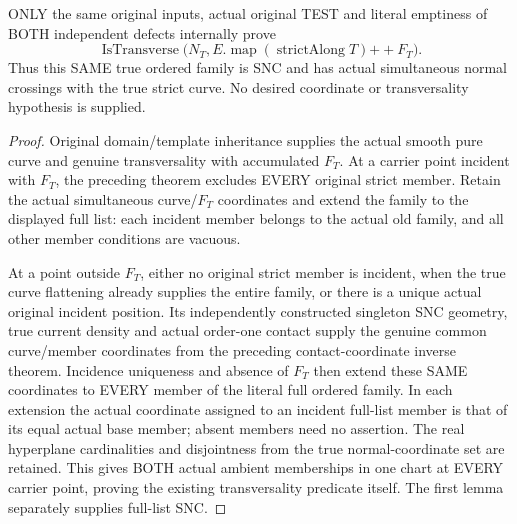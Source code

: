 \begin{theorem}
\label{hir:sharp-original-curve-two-empty-defects-whole-boundary-transverse}
\leanok
ONLY the same original inputs, actual original TEST and literal emptiness
of BOTH independent defects internally prove
\[
 \operatorname{IsTransverse}\bigl(N_T,
   E.\operatorname{map}(\operatorname{strictAlong}T)\mathbin{++}F_T\bigr).
\]
Thus this SAME true ordered family is SNC and has actual simultaneous
normal crossings with the true strict curve. No desired coordinate or
transversality hypothesis is supplied.
\end{theorem}
\begin{proof}
Original domain/template inheritance supplies the actual smooth pure
curve and genuine transversality with accumulated $F_T$.
At a carrier point incident with $F_T$, the preceding theorem excludes
EVERY original strict member. Retain the actual simultaneous curve/$F_T$
coordinates and extend the family to the displayed full list: each
incident member belongs to the actual old family, and all other member
conditions are vacuous.

At a point outside $F_T$, either no original strict member is incident,
when the true curve flattening already supplies the entire family, or
there is a unique actual original incident position. Its independently
constructed singleton SNC geometry, true current density and actual
order-one contact supply the genuine common curve/member coordinates
from the preceding contact-coordinate inverse theorem. Incidence
uniqueness and absence of $F_T$ then extend these SAME coordinates to
EVERY member of the literal full ordered family. In each extension the
actual coordinate assigned to an incident full-list member is that of
its equal actual base member; absent members need no assertion. The real
hyperplane cardinalities and disjointness from the true normal-coordinate
set are retained. This gives BOTH actual ambient memberships in one
chart at EVERY carrier point, proving the existing transversality
predicate itself. The first lemma separately supplies full-list SNC.
\end{proof}

